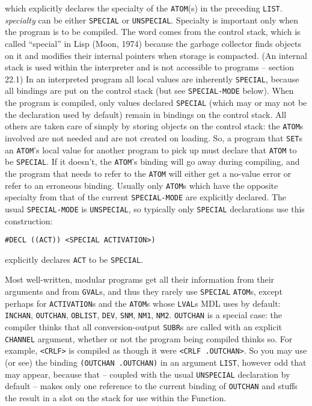 \documentclass[a4paper,]{article}
\begin{document}
which explicitly declares the specialty of the \texttt{ATOM}(s) in the preceding \texttt{LIST}. \emph{specialty} can be
either \texttt{SPECIAL}  or \texttt{UNSPECIAL}. Specialty
is important only when the program is to be compiled. The word comes from the control stack, which is called ``special'' in
Lisp (Moon, 1974) because the garbage collector finds objects on it and modifies their internal pointers when storage is
compacted. (An internal stack is used within the interpreter and is not accessible to programs -- section 22.1) In an
interpreted program all local values are inherently \texttt{SPECIAL}, because all bindings are put on the control stack
(but see \texttt{SPECIAL-MODE}  below). When the program is compiled, only values declared
\texttt{SPECIAL} (which may or may not be the declaration used by default) remain in bindings on the control stack. All
others are taken care of simply by storing objects on the control stack: the \texttt{ATOM}s involved are not needed and are
not created on loading. So, a program that \texttt{SET}s an \texttt{ATOM}'s local value for another program to pick up must
declare that \texttt{ATOM} to be \texttt{SPECIAL}. If it doesn't, the \texttt{ATOM}'s binding will go away during
compiling, and the program that needs to refer to the \texttt{ATOM} will either get a no-value error or refer to an
erroneous binding. Usually only \texttt{ATOM}s which have the opposite specialty from that of the current
\texttt{SPECIAL-MODE} are explicitly declared. The usual \texttt{SPECIAL-MODE} is \texttt{UNSPECIAL}, so typically only
\texttt{SPECIAL} declarations use this construction:

\begin{verbatim}
#DECL ((ACT)) <SPECIAL ACTIVATION>)
\end{verbatim}

explicitly declares \texttt{ACT} to be \texttt{SPECIAL}.

Most well-written, modular programs get all their information from their arguments and from \texttt{GVAL}s, and thus they
rarely use \texttt{SPECIAL} \texttt{ATOM}s, except perhaps for \texttt{ACTIVATION}s and the \texttt{ATOM}s whose
\texttt{LVAL}s MDL uses by default: \texttt{INCHAN}, \texttt{OUTCHAN}, \texttt{OBLIST},
\texttt{DEV}, \texttt{SNM}, \texttt{NM1}, \texttt{NM2}. \texttt{OUTCHAN} is a special case: the compiler thinks that all
conversion-output \texttt{SUBR}s are called with an explicit \texttt{CHANNEL} argument, whether or not the program being
compiled thinks so. For example, \texttt{\textless{}CRLF\textgreater{}} is compiled as though it were
\texttt{\textless{}CRLF\ .OUTCHAN\textgreater{}}. So you may use (or see) the binding \texttt{(OUTCHAN\ .OUTCHAN)} in an
argument \texttt{LIST}, however odd that may appear, because that -- coupled with the usual \texttt{UNSPECIAL} declaration
by default -- makes only one reference to the current binding of \texttt{OUTCHAN} and stuffs the result in a slot on the
stack for use within the Function.
\end{document}
